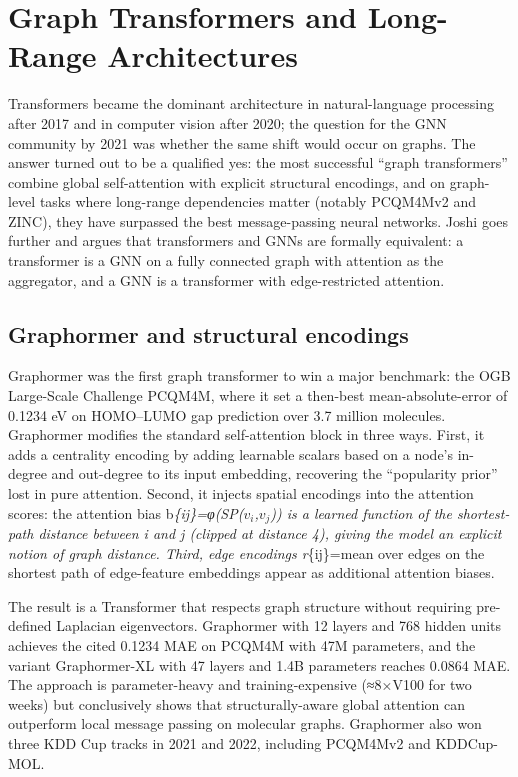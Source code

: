 \documentclass{article}
\begin{document}
\section{Graph Transformers and Long-Range Architectures}\label{sec:graph-transformers-and-long-range-architectures}
Transformers became the dominant architecture in natural-language processing after 2017 and in computer vision after 2020; the question for the GNN community by 2021 was whether the same shift would occur on graphs. The answer turned out to be a qualified yes: the most successful ``graph transformers'' combine global self-attention with explicit structural encodings, and on graph-level tasks where long-range dependencies matter (notably PCQM4Mv2 and ZINC), they have surpassed the best message-passing neural networks. Joshi \citet{joshi2025transformersaregra} goes further and argues that transformers and GNNs are formally equivalent: a transformer is a GNN on a fully connected graph with attention as the aggregator, and a GNN is a transformer with edge-restricted attention.

\subsection{Graphormer and structural encodings}\label{graphormer-and-structural-encodings}

Graphormer \citep{ying2021dotransformersreal} was the first graph transformer to win a major benchmark: the OGB Large-Scale Challenge PCQM4M, where it set a then-best mean-absolute-error of 0.1234 eV on HOMO--LUMO gap prediction over 3.7 million molecules. Graphormer modifies the standard self-attention block in three ways. First, it adds a centrality encoding by adding learnable scalars based on a node's in-degree and out-degree to its input embedding, recovering the ``popularity prior'' lost in pure attention. Second, it injects spatial encodings into the attention scores: the attention bias b\emph{\{ij\}=φ(SP(\(v_i\),\(v_j\))) is a learned function of the shortest-path distance between i and j (clipped at distance 4), giving the model an explicit notion of graph distance. Third, edge encodings r}\{ij\}=mean over edges on the shortest path of edge-feature embeddings appear as additional attention biases.

The result is a Transformer that respects graph structure without requiring pre-defined Laplacian eigenvectors. Graphormer with 12 layers and 768 hidden units achieves the cited 0.1234 MAE on PCQM4M with 47M parameters, and the variant Graphormer-XL with 47 layers and 1.4B parameters reaches 0.0864 MAE. The approach is parameter-heavy and training-expensive (≈8×V100 for two weeks) but conclusively shows that structurally-aware global attention can outperform local message passing on molecular graphs. Graphormer also won three KDD Cup tracks in 2021 and 2022, including PCQM4Mv2 and KDDCup-MOL.
\end{document}
